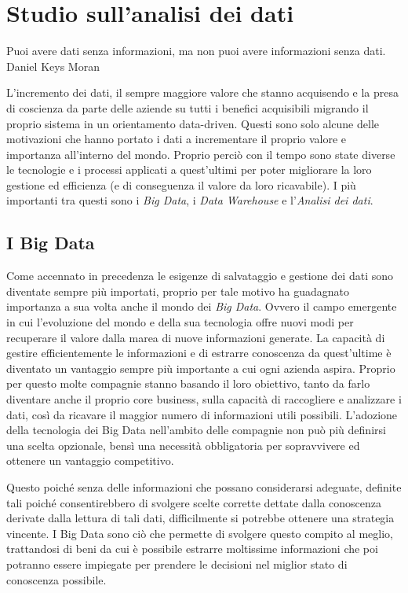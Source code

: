 \chapter{Studio sull'analisi dei dati}
\label{ch:Studio sull'analisi dei dati}

\begin{citazione}
Puoi avere dati senza informazioni, ma non puoi avere informazioni senza dati. Daniel Keys Moran~\cite{daniel_keys_moran_cyte}
\end{citazione}

L'incremento dei dati, il sempre maggiore valore che stanno acquisendo e la presa di coscienza da parte delle aziende su tutti i benefici acquisibili migrando il proprio sistema in un orientamento data-driven. Questi sono solo alcune delle motivazioni che hanno portato i dati a incrementare il proprio valore e importanza all'interno del mondo. Proprio perciò con il tempo sono state diverse le tecnologie e i processi applicati a quest'ultimi per poter migliorare la loro gestione ed efficienza (e di conseguenza il valore da loro ricavabile). I più importanti tra questi sono i \textit{Big Data}, i \textit{Data Warehouse} e l'\textit{Analisi dei dati}.

\section{I Big Data}

Come accennato in precedenza le esigenze di salvataggio e gestione dei dati sono diventate sempre più importati, proprio per tale motivo ha guadagnato importanza a sua volta anche il mondo dei \textit{Big Data}. Ovvero il campo emergente in cui l’evoluzione del mondo e della sua tecnologia offre nuovi modi per recuperare il valore dalla marea di nuove informazioni generate. La capacità di gestire efficientemente le informazioni e di estrarre conoscenza da quest’ultime è diventato un vantaggio sempre più importante a cui ogni azienda aspira. Proprio per questo molte compagnie stanno basando il loro obiettivo, tanto da farlo diventare anche il proprio core business, sulla capacità di raccogliere e analizzare i dati, così da ricavare il maggior numero di informazioni utili possibili. L’adozione della tecnologia dei Big Data nell’ambito delle compagnie non può più definirsi una scelta opzionale, bensì una necessità obbligatoria per sopravvivere ed ottenere un vantaggio competitivo.\cite{new_horizon_for_a_data_driven_economy}

Questo poiché senza delle informazioni che possano considerarsi adeguate, definite tali poiché consentirebbero di svolgere scelte corrette dettate dalla conoscenza derivate dalla lettura di tali dati, difficilmente si potrebbe ottenere una strategia vincente. I Big Data sono ciò che permette di svolgere questo compito al meglio, trattandosi di beni da cui è possibile estrarre moltissime informazioni che poi potranno essere impiegate per prendere le decisioni nel miglior stato di conoscenza possibile.\cite{iusitinere_big_data}


